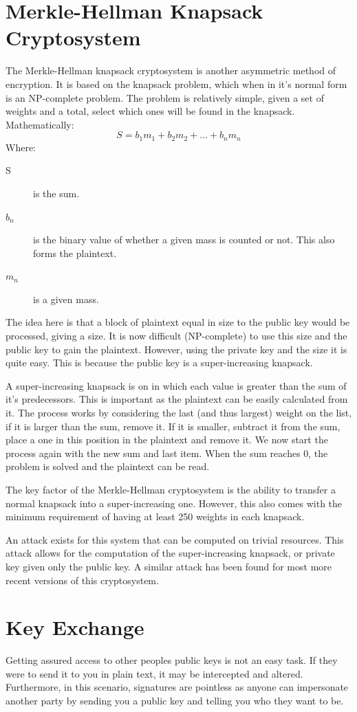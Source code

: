 	\section{Merkle-Hellman Knapsack Cryptosystem}
		The Merkle-Hellman knapsack cryptosystem is another asymmetric method of encryption. 
		It is based on the knapsack problem, which when in it's normal form is an NP-complete problem. 
		The problem is relatively simple, given a set of weights and a total, select which ones will be found in the knapsack. 
		Mathematically:
		$$S = b_1m_1 + b_2m_2 +\ldots+ b_nm_n$$
		Where:
		\begin{description}
			\item[S] is the sum.
			\item[$b_n$] is the binary value of whether a given mass is counted or not. 
				This also forms the plaintext. 
			\item[$m_n$] is a given mass. 
		\end{description}

		The idea here is that a block of plaintext equal in size to the public key would be processed, giving a size. 
		It is now difficult (NP-complete) to use this size and the public key to gain the plaintext. 
		However, using the private key and the size it is quite easy. 
		This is because the public key is a super-increasing knapsack. 

		A super-increasing knapsack is on in which each value is greater than the sum of it's predecessors. 
		This is important as the plaintext can be easily calculated from it. 
		The process works by considering the last (and thus largest) weight on the list, if it is larger than the sum, remove it.
		If it is smaller, subtract it from the sum, place a one in this position in the plaintext and remove it.
		We now start the process again with the new sum and last item. 
		When the sum reaches 0, the problem is solved and the plaintext can be read. 

		The key factor of the Merkle-Hellman cryptosystem is the ability to transfer a normal knapsack into a super-increasing one.
		However, this also comes with the minimum requirement of having at least 250 weights in each knapsack. 

		An attack exists for this system that can be computed on trivial resources\cite{BrokenKnapsack}. 
		This attack allows for the computation of the super-increasing knapsack, or private key given only the public key. 
		A similar attack has been found for most more recent versions of this cryptosystem. 
	\section{Key Exchange}
		Getting assured access to other peoples public keys is not an easy task. 
		If they were to send it to you in plain text, it may be intercepted and altered. 
		Furthermore, in this scenario, signatures are pointless as anyone can impersonate another party by sending you a public key and telling you who they want to be. 


